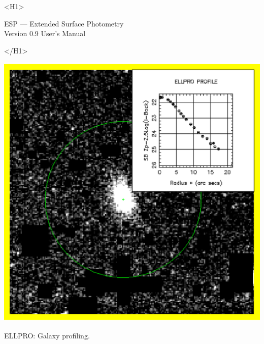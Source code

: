 \documentclass[twoside,11pt]{article}
\newcommand{\stardoctitle}     {ESP --- Extended Surface Photometry}
\newcommand{\stardocversion}   {Version 0.9}
\newcommand{\stardocmanual}    {User's Manual}
\newcommand{\xlabel}[1]{}
\begin{document}
\begin{htmlonly}
   \xlabel{}
   \begin{rawhtml} <H1> \end{rawhtml}
      \stardoctitle\\
      \stardocversion
      \stardocmanual
   \begin{rawhtml} </H1> \end{rawhtml}

   \includegraphics{sun180_diag3.eps}

   \begin{center}
   ELLPRO: Galaxy profiling.
   \end{center}


\end{htmlonly}
\end{document}
